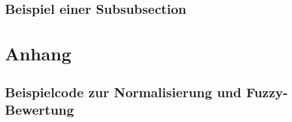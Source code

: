 \documentclass[10pt, ngerman, a4paper,toc=graduated, parskip=half, numbers=noenddot, headings=standardclasses, nonumberlist]{scrartcl}
\begin{document}
\subsection{Beispiel einer Subsubsection}
\label{beispiel_einer_subsubsection}

\newpage
{}


\newpage
\appendix
\section{Anhang}

\newpage
\subsection{Beispielcode zur Normalisierung und Fuzzy-Bewertung}
\label{a1_normalisierung_fuzzy}
\end{document}
